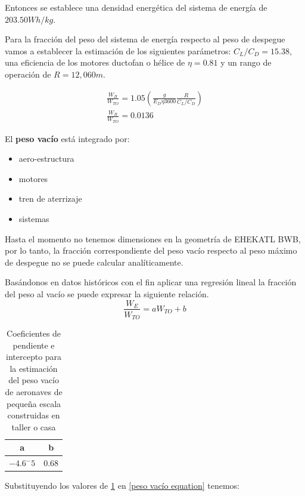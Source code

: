 Entonces  se establece una densidad energética del sistema de energía de $203.50 Wh/kg$.

Para la fracción del peso del sistema de energía respecto al peso de despegue vamos a establecer la estimación de los siguientes parámetros: $C_L / C_D = 15.38$, una eficiencia de los motores ductofan o hélice de  $\eta  = 0.81$ y un rango de operación de  $R= 12,060 m$.

\begin{gather}
    \frac{W_B}{W_{TO}} = 1.05 (\frac{g}{E_D \eta 3600} \frac{R}{C_L/C_D}) \\
    \frac{W_B}{W_{TO}} = 0.0136
\end{gather}

\medskip

El \textbf{peso vacío} está integrado por:
\begin{itemize}
    \item aero-estructura
    \item motores
    \item tren de aterrizaje
    \item sistemas
\end{itemize}

Hasta el momento no tenemos dimensiones en la geometría de EHEKATL BWB, por lo tanto, la fracción correspondiente del peso vacío respecto al peso máximo de despegue no se puede calcular analíticamente. 

Basándonos en datos históricos con el fin aplicar una regresión lineal la fracción del peso al vacío se puede expresar la siguiente relación. 
\begin{equation}
\label{peso vacío equation}
    \frac{W_E}{W_{TO}}= a W_{TO} + b
\end{equation}


\begin{table}[!h]
    \centering
    \begin{tabular}{|c|c|}
    \hline
    a & b \\
    \hline
     $-4.6^-5$& $0.68$  \\
    \hline
    \end{tabular}
    \caption{Coeficientes de pendiente e intercepto para la estimación del peso vacío de aeronaves de pequeña escala construidas en taller o casa \cite{Sadraey2013}}
    \label{coeficientes del peso al vacío}
\end{table}

Substituyendo los valores de \ref{coeficientes del peso al vacío} en \ref{peso vacío equation} tenemos: 


